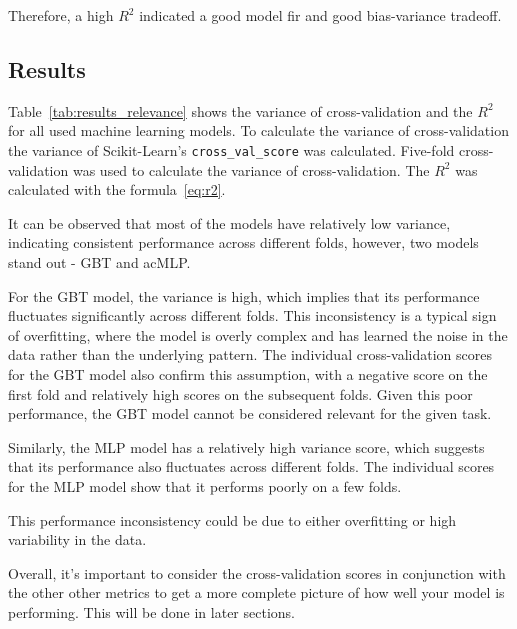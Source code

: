 Therefore, a high \(R^2\) indicated a good model fir and good bias-variance
tradeoff\cite[p. 43]{muller_introductionmachinelearning_2016}.

\subsection{Results}\label{subsec:results3}

Table~\ref*{tab:results_relevance} shows the variance of cross-validation
and the \(R^2\) for all used machine learning models.
To calculate the variance of cross-validation the variance of Scikit-Learn's
\texttt{cross\_val\_score} was calculated.
Five-fold cross-validation was used to calculate the variance of
cross-validation.
The \(R^2\) was calculated with the formula~\ref{eq:r2}.

It can be observed that most of the models have relatively low variance, indicating
consistent performance across different folds, however, two models stand out - \ac{GBT}
and ac{MLP}.

For the \ac{GBT} model, the variance is high, which implies that its performance
fluctuates significantly across different folds.
This inconsistency is a typical sign of overfitting, where the model is overly complex
and has learned the noise in the data rather than the underlying pattern.
The individual cross-validation scores for the GBT model also confirm this assumption,
with a negative score on the first fold and relatively high scores on the subsequent
folds.
Given this poor performance, the GBT model cannot be considered relevant for the given
task.

Similarly, the \ac{MLP} model has a relatively high variance score, which suggests that
its performance also fluctuates across different folds. The individual scores for the MLP
model show that it performs poorly on a few folds.

This performance inconsistency could be due to either overfitting or high variability
in the data.

Overall, it's important to consider the cross-validation scores in conjunction with
the other other metrics to get a more complete picture of how well your model is
performing.
This will be done in later sections.


